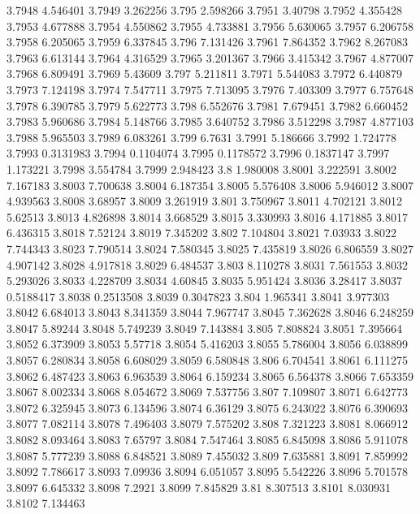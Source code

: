 3.7948  4.546401
3.7949  3.262256
3.795  2.598266
3.7951  3.40798
3.7952  4.355428
3.7953  4.677888
3.7954  4.550862
3.7955  4.733881
3.7956  5.630065
3.7957  6.206758
3.7958  6.205065
3.7959  6.337845
3.796  7.131426
3.7961  7.864352
3.7962  8.267083
3.7963  6.613144
3.7964  4.316529
3.7965  3.201367
3.7966  3.415342
3.7967  4.877007
3.7968  6.809491
3.7969  5.43609
3.797  5.211811
3.7971  5.544083
3.7972  6.440879
3.7973  7.124198
3.7974  7.547711
3.7975  7.713095
3.7976  7.403309
3.7977  6.757648
3.7978  6.390785
3.7979  5.622773
3.798  6.552676
3.7981  7.679451
3.7982  6.660452
3.7983  5.960686
3.7984  5.148766
3.7985  3.640752
3.7986  3.512298
3.7987  4.877103
3.7988  5.965503
3.7989  6.083261
3.799  6.7631
3.7991  5.186666
3.7992  1.724778
3.7993  0.3131983
3.7994  0.1104074
3.7995  0.1178572
3.7996  0.1837147
3.7997  1.173221
3.7998  3.554784
3.7999  2.948423
3.8  1.980008
3.8001  3.222591
3.8002  7.167183
3.8003  7.700638
3.8004  6.187354
3.8005  5.576408
3.8006  5.946012
3.8007  4.939563
3.8008  3.68957
3.8009  3.261919
3.801  3.750967
3.8011  4.702121
3.8012  5.62513
3.8013  4.826898
3.8014  3.668529
3.8015  3.330993
3.8016  4.171885
3.8017  6.436315
3.8018  7.52124
3.8019  7.345202
3.802  7.104804
3.8021  7.03933
3.8022  7.744343
3.8023  7.790514
3.8024  7.580345
3.8025  7.435819
3.8026  6.806559
3.8027  4.907142
3.8028  4.917818
3.8029  6.484537
3.803  8.110278
3.8031  7.561553
3.8032  5.293026
3.8033  4.228709
3.8034  4.60845
3.8035  5.951424
3.8036  3.28417
3.8037  0.5188417
3.8038  0.2513508
3.8039  0.3047823
3.804  1.965341
3.8041  3.977303
3.8042  6.684013
3.8043  8.341359
3.8044  7.967747
3.8045  7.362628
3.8046  6.248259
3.8047  5.89244
3.8048  5.749239
3.8049  7.143884
3.805  7.808824
3.8051  7.395664
3.8052  6.373909
3.8053  5.57718
3.8054  5.416203
3.8055  5.786004
3.8056  6.038899
3.8057  6.280834
3.8058  6.608029
3.8059  6.580848
3.806  6.704541
3.8061  6.111275
3.8062  6.487423
3.8063  6.963539
3.8064  6.159234
3.8065  6.564378
3.8066  7.653359
3.8067  8.002334
3.8068  8.054672
3.8069  7.537756
3.807  7.109807
3.8071  6.642773
3.8072  6.325945
3.8073  6.134596
3.8074  6.36129
3.8075  6.243022
3.8076  6.390693
3.8077  7.082114
3.8078  7.496403
3.8079  7.575202
3.808  7.321223
3.8081  8.066912
3.8082  8.093464
3.8083  7.65797
3.8084  7.547464
3.8085  6.845098
3.8086  5.911078
3.8087  5.777239
3.8088  6.848521
3.8089  7.455032
3.809  7.635881
3.8091  7.859992
3.8092  7.786617
3.8093  7.09936
3.8094  6.051057
3.8095  5.542226
3.8096  5.701578
3.8097  6.645332
3.8098  7.2921
3.8099  7.845829
3.81  8.307513
3.8101  8.030931
3.8102  7.134463
